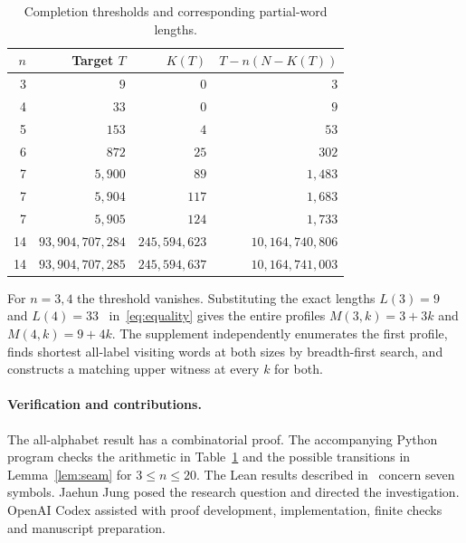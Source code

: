 \documentclass[11pt]{article}
\begin{document}
\begin{table}[ht]
\centering
\caption{Completion thresholds and corresponding partial-word lengths.}
\label{tab:numerical}
\begin{tabular}{rrrr}
\toprule
$n$ & Target $T$ & $K(T)$ & $T-n(N-K(T))$\\
\midrule
3 & $9$ & $0$ & $3$\\
4 & $33$ & $0$ & $9$\\
5 & $153$ & $4$ & $53$\\
6 & $872$ & $25$ & $302$\\
7 & $5{,}900$ & $89$ & $1{,}483$\\
7 & $5{,}904$ & $117$ & $1{,}683$\\
7 & $5{,}905$ & $124$ & $1{,}733$\\
14 & $93{,}904{,}707{,}284$ & $245{,}594{,}623$ & $10{,}164{,}740{,}806$\\
14 & $93{,}904{,}707{,}285$ & $245{,}594{,}637$ & $10{,}164{,}741{,}003$\\
\bottomrule
\end{tabular}
\end{table}

For $n=3,4$ the threshold vanishes. Substituting the exact lengths $L(3)=9$ and $L(4)=33$~\cite{almanac} in~\eqref{eq:equality} gives the entire profiles $M(3,k)=3+3k$ and $M(4,k)=9+4k$. The supplement independently enumerates the first profile, finds shortest all-label visiting words at both sizes by breadth-first search, and constructs a matching upper witness at every $k$ for both.

\paragraph{Verification and contributions.}
The all-alphabet result has a combinatorial proof. The accompanying Python program checks the arithmetic in Table~\ref{tab:numerical} and the possible transitions in Lemma~\ref{lem:seam} for $3\le n\le20$. The Lean results described in~\cite{seven} concern seven symbols. Jaehun Jung posed the research question and directed the investigation. OpenAI Codex assisted with proof development, implementation, finite checks and manuscript preparation.
\end{document}
